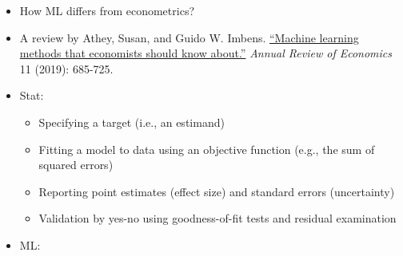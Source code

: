 \documentclass[
]{book}
\begin{document}
\begin{itemize}
  \begin{itemize}
  \item
    \(y\) \textless- unknown \textless- \(x\)
  \item
    \(y\) \textless-\textgreater{} decision trees, neural nets \textless-\textgreater{} \(x\)
  \item
    For the main idea behind prediction modeling, see Breiman, Leo (Berkeley stat faculty who passed away in 2005). \href{https://projecteuclid.org/euclid.ss/1009213726}{``Statistical modeling: The two cultures (with comments and a rejoinder by the author).''} \emph{Statistical science} 16, no. 3 (2001): 199-231.
  \item
    ``The problem is to find an algorithm \(f(x)\) such that for future \(x\) in a test set, \(f(x)\) will be a good predictor of \(y\).''
  \item
    ``There are \textbf{two cultures} in the use of statistical modeling to reach conclusions from data. One assumes that the data are generated by a \textbf{given} \textbf{stochastic data model}. The other uses \textbf{algorithmic models} and treats the data mechanism as \textbf{unknown}.''
  \end{itemize}
\item
  How ML differs from econometrics?
\item
  A review by Athey, Susan, and Guido W. Imbens. \href{https://www.annualreviews.org/doi/full/10.1146/annurev-economics-080217-053433}{``Machine learning methods that economists should know about.''} \emph{Annual Review of Economics} 11 (2019): 685-725.
\item
  Stat:

  \begin{itemize}
  \item
    Specifying a target (i.e., an estimand)
  \item
    Fitting a model to data using an objective function (e.g., the sum of squared errors)
  \item
    Reporting point estimates (effect size) and standard errors (uncertainty)
  \item
    Validation by yes-no using goodness-of-fit tests and residual examination
  \end{itemize}
\item
  ML:


\end{itemize}
\end{document}
